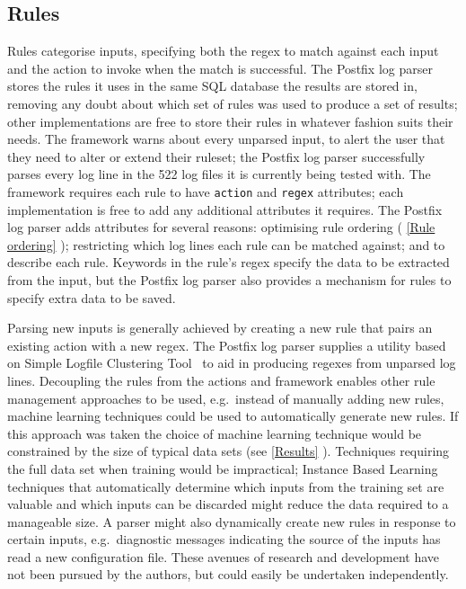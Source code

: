 \documentclass[preprint,draft,numbers]{elsarticle}
\newcommand{\sectionref}[1]{%
    \textsection{}\vref*{#1}%
}
\newcommand{\numberOFlogFILESall}[0]{%
    522%
}
\begin{document}
\subsection{Rules}

\label{Rules}

Rules categorise inputs, specifying both the regex to match against each
input and the action to invoke when the match is successful.  The Postfix
log parser stores the rules it uses in the same SQL database the results
are stored in, removing any doubt about which set of rules was used to
produce a set of results; other implementations are free to store their
rules in whatever fashion suits their needs.  The framework warns about
every unparsed input, to alert the user that they need to alter or extend
their ruleset; the Postfix log parser successfully parses every log line in
the \numberOFlogFILESall{} log files it is currently being tested with.
The framework requires each rule to have \texttt{action} and \texttt{regex}
attributes; each implementation is free to add any additional attributes it
requires.  The Postfix log parser adds attributes for several reasons:
optimising rule ordering (\sectionref{Rule ordering}); restricting which
log lines each rule can be matched against; and to describe each rule.
Keywords in the rule's regex specify the data to be extracted from the
input, but the Postfix log parser also provides a mechanism for rules to
specify extra data to be saved.

Parsing new inputs is generally achieved by creating a new rule that pairs
an existing action with a new regex.  The Postfix log parser supplies a
utility based on Simple Logfile Clustering Tool~\cite{slct-paper} to aid in
producing regexes from unparsed log lines.  Decoupling the rules from the
actions and framework enables other rule management approaches to be used,
e.g.\ instead of manually adding new rules, machine learning techniques
could be used to automatically generate new rules.  If this approach was
taken the choice of machine learning technique would be constrained by the
size of typical data sets (see \sectionref{Results}).  Techniques requiring
the full data set when training would be impractical; Instance Based
Learning~\cite{instance-based-learning} techniques that automatically
determine which inputs from the training set are valuable and which inputs
can be discarded might reduce the data required to a manageable size.  A
parser might also dynamically create new rules in response to certain
inputs, e.g.\ diagnostic messages indicating the source of the inputs has
read a new configuration file.  These avenues of research and development
have not been pursued by the authors, but could easily be undertaken
independently.
\end{document}
